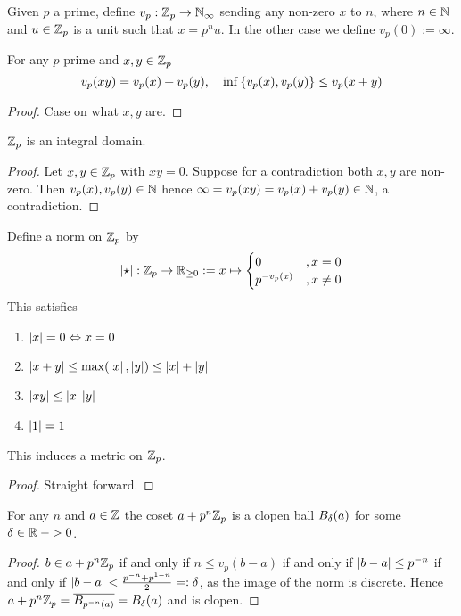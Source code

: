 \begin{dfn}
    Given $p$ a prime, define $v_p : \mathbb{Z}_p \to \mathbb{N}_\infty$
    sending any non-zero $x$ to $n$,
    where $n \in \mathbb{N}$
    and $u \in \mathbb{Z}_p$ is a unit such that $x = p^n u$.
    In the other case we define $v_p(0):=\infty$.
\end{dfn}

\begin{prop}
    For any $p$ prime and $x,y \in \mathbb{Z}_p$
    \[v_p(x y) = v_p(x) + v_p(y), \quad 
    \inf \left\{v_p(x), v_p(y)\right\} \le v_p(x + y)\]
\end{prop}
\begin{proof}
    Case on what $x,y$ are.
\end{proof}

\begin{cor}
    $\Z_p$ is an integral domain.
\end{cor}
\begin{proof}
    Let $x, y \in \mathbb{Z}_p$ with $xy = 0$.
    Suppose for a contradiction both $x, y$ are non-zero.
    Then $v_p(x), v_p(y) \in \mathbb{N}$ hence
    $\infty = v_p(x y) = v_p(x) + v_p(y) \in \mathbb{N}$, 
    a contradiction.
\end{proof}

\begin{dfn}[Metric on $\Z_p$]
    Define a norm on $\Z_p$ by 
    \[\left\vert \star \right\vert : \mathbb{Z}_p \to \mathbb{R}_{\ge 0} := x \mapsto 
    \begin{cases}
        0 &, x = 0\\
        p^{-v_p(x)} &, x \ne 0
    \end{cases}\]
    This satisfies 
    \begin{enumerate}
        \item $\left\vert x \right\vert = 0 \Leftrightarrow x = 0$
        \item $\left\vert x + y \right\vert \le \max(\left\vert x \right\vert,\left\vert y \right\vert) \le \left\vert x \right\vert + \left\vert y \right\vert$
        \item $\left\vert xy \right\vert \le \left\vert x \right\vert \left\vert y \right\vert$
        \item $\left\vert 1 \right\vert = 1$
    \end{enumerate}
    This induces a metric on $\Z_p$.
\end{dfn}
\begin{proof}
    Straight forward.
\end{proof}

\begin{prop}
    For any $n$ and $a \in \mathbb{Z}$
    the coset $a + p^n \mathbb{Z}_p$ is a clopen ball
    $B_{\delta} (a)$ for some $\delta \in \mathbb{R}-{>0}$.
\end{prop}
\begin{proof}
    $b \in a + p^n \mathbb{Z}_p$ if and only if 
    $n \le v_p(b - a)$ if and only if 
    $\left\vert b - a \right\vert \le p^{-n}$
    if and only if 
    $\left\vert b - a \right\vert < \frac{p^{-n}+p^{1-n}}{2} =: \delta$,
    as the image of the norm is discrete.
    Hence $a + p^n \mathbb{Z}_p = \overline{B_{p^{-n}(a)}} = B_\delta(a)$ and is clopen.
\end{proof}

